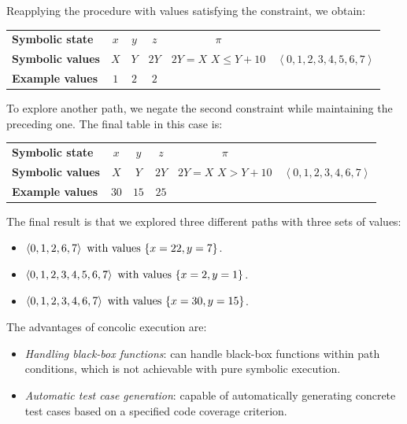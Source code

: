 \begin{example}
    Reapplying the procedure with values satisfying the constraint, we obtain:
    \begin{table}[H]
        \centering
        \begin{tabular}{l|ccccc}
        \textbf{Symbolic state}  & $x$ & $y$ & $z$ & $\pi$ & \multirow{4}{*}{$\left\langle 0,1,2,3,4,5,6,7 \right\rangle $} \\ \cline{1-5}
        \textbf{Symbolic values} & $X$ & $Y$ & $2Y$ & \makecell{$2Y = X$ \\ $X \leq Y+10$} &                 \\
        \textbf{Example values}  & $1$ & $2$ & $2$ &                  
        \end{tabular}
    \end{table}
    To explore another path, we negate the second constraint while maintaining the preceding one. 
    The final table in this case is:
    \begin{table}[H]
        \centering
        \begin{tabular}{l|ccccc}
        \textbf{Symbolic state}  & $x$ & $y$ & $z$ & $\pi$ & \multirow{4}{*}{$\left\langle 0,1,2,3,4,6,7 \right\rangle $} \\ \cline{1-5}
        \textbf{Symbolic values} & $X$ & $Y$ & $2Y$ & \makecell{$2Y = X$ \\ $X > Y+10$} &                 \\
        \textbf{Example values}  & $30$ & $15$ & $25$ &                  
        \end{tabular}
    \end{table}
    The final result is that we explored three different paths with three sets of values:
    \begin{itemize}
        \item $\left\langle 0,1,2,6,7 \right\rangle \textnormal{ with values } \{x=22, y=7\}$.
        \item $\left\langle 0,1,2,3,4,5,6,7 \right\rangle \textnormal{ with values } \{x=2, y=1\}$.
        \item $\left\langle 0,1,2,3,4,6,7 \right\rangle \textnormal{ with values } \{x=30, y=15\}$.
    \end{itemize}
\end{example}
The advantages of concolic execution are: 
\begin{itemize}
    \item \textit{Handling black-box functions}: can handle black-box functions within path conditions, which is not achievable with pure symbolic execution.
    \item \textit{Automatic test case generation}: capable of automatically generating concrete test cases based on a specified code coverage criterion.
\end{itemize} 
